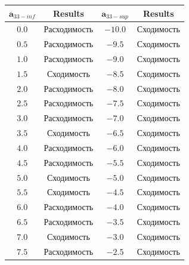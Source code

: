 \documentclass[../body.tex]{subfiles}
\begin{document}
\begin{table}[H]
			\centering
			\begin{tabular}{|c|c|c|c|}
				\hline
				$\textbf{a}_{33 - inf}$ & \textbf{Results} & $\textbf{a}_{33 - sup}$ & \textbf{Results}\\
				
				\hline
				$0.0$ & Расходимость & $-10.0$ & Сходимость \\
				
				\hline
				$0.5$ & Расходимость & $-9.5$ & Сходимость \\
				
				\hline
				$1.0$ & Расходимость & $-9.0$ & Сходимость \\
				
				\hline
				$1.5$ & Сходимость & $-8.5$ & Сходимость \\
				
				\hline
				$2.0$ & Расходимость & $-8.0$ & Сходимость \\
				
				\hline
				$2.5$ & Расходимость & $-7.5$ & Сходимость \\
				
				\hline
				$3.0$ & Расходимость & $-7.0$ & Сходимость \\
				
				\hline
				$3.5$ & Сходимость & $-6.5$ & Сходимость \\
				
				\hline
				$4.0$ & Расходимость & $-6.0$ & Сходимость \\
				
				\hline
				$4.5$ & Расходимость & $-5.5$ & Сходимость \\
				
				\hline
				$5.0$ & Сходимость & $-5.0$ & Сходимость\\
				
				\hline
				$5.5$ & Сходимость & $-4.5$ & Сходимость\\
				
				\hline
				$6.0$ & Расходимость & $-4.0$ & Сходимость \\
				
				\hline
				$6.5$ & Расходимость & $-3.5$ & Сходимость \\
				
				\hline
				$7.0$ & Сходимость & $-3.0$ & Сходимость \\
				
				\hline
				$7.5$ & Расходимость & $-2.5$ & Сходимость \\
				

\end{tabular}
\end{table}
\end{document}
